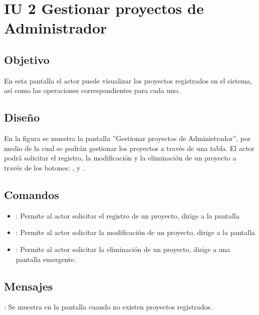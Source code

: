 \section{IU 2 Gestionar proyectos de Administrador}

\subsection{Objetivo}
	En esta pantalla el actor puede visualizar los proyectos registrados en el sistema, así como las operaciones correspondientes para cada uno.

\subsection{Diseño}
	En la figura  se muestra la pantalla ''Gestionar proyectos de Administrador'', por medio de la cual se podrán gestionar los proyectos a través de una tabla. El actor podrá solicitar el registro, la modificación y la eliminación de un proyecto a través de los botones: , \editar y \eliminar.

\subsection{Comandos}
\begin{itemize}
	\item {}: Permite al actor solicitar el registro de un proyecto, dirige a la pantalla 
	\item \editar [Modificar]: Permite al actor solicitar la modificación de un proyecto, dirige a la pantalla 
	\item \eliminar [Eliminar]: Permite al actor solicitar la eliminación de un proyecto, dirige a una pantalla emergente.
\end{itemize}

\subsection{Mensajes}

\begin{Citemize}
	\item {}: Se muestra en la pantalla  cuando no existen proyectos registrados.
\end{Citemize}
